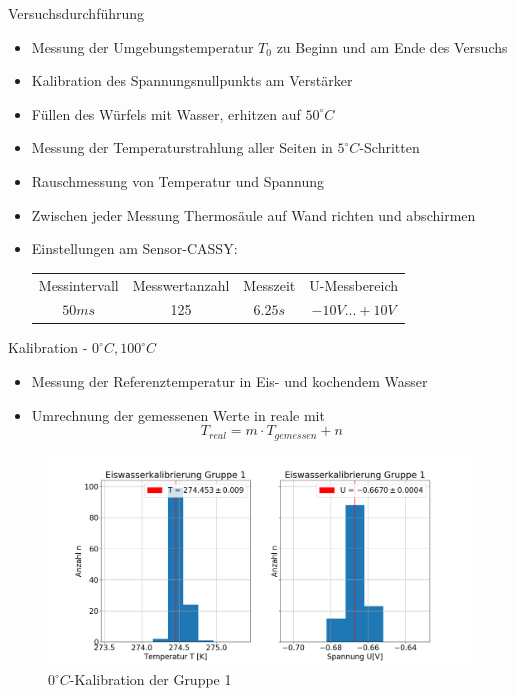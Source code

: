 \documentclass[12pt]{beamer}
\begin{document}
\begin{frame}{Versuchsdurchführung}
\begin{itemize}
	\item Messung der Umgebungstemperatur $T_0$ zu Beginn und am Ende des Versuchs
	\item Kalibration des Spannungsnullpunkts am Verstärker
	\item Füllen des Würfels mit Wasser, erhitzen auf $50^\circ C$
	\item Messung der Temperaturstrahlung aller Seiten in $5^\circ C$-Schritten
	\item Rauschmessung von Temperatur und Spannung
	\item Zwischen jeder Messung Thermosäule auf Wand richten und abschirmen
	\item Einstellungen am Sensor-CASSY:
	\begin{table}[h]
	\centering
	\begin{tabular}{cccc}
		\hline Messintervall & Messwertanzahl & Messzeit & U-Messbereich \\
		$50ms$& 125& $6.25s$& $-10V...+10V$ \\
		\hline
	\end{tabular}
	\end{table}
	
\end{itemize}
\end{frame}

\begin{frame}{Kalibration - $0^\circ C, 100^\circ C$}
\begin{itemize}
	\item Messung der Referenztemperatur in Eis- und kochendem Wasser
	\item Umrechnung der gemessenen Werte in reale mit
	\begin{equation*}
	T_{real} = m \cdot T_{gemessen} + n
	\end{equation*}
\end{itemize}
\begin{figure}[H]
	\includegraphics[scale=0.2]{../Protokoll/Bilder/Gruppe1_Eiswasser.png}
	\caption{$0^\circ C$-Kalibration der Gruppe 1}
\end{figure}
\end{frame}
\end{document}
